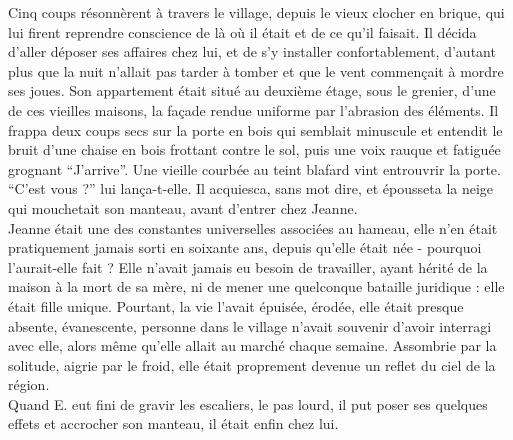 \documentclass[french,amstex,12pt,a5paper]{book}
\begin{document}
Cinq coups résonnèrent à travers le village, depuis le vieux clocher en brique, qui lui firent reprendre conscience de là où il était et de ce qu'il faisait. Il décida d'aller déposer ses affaires chez lui, et de s'y installer confortablement, d'autant plus que la nuit n'allait pas tarder à tomber et que le vent commençait à mordre ses joues. Son appartement était situé au deuxième étage, sous le grenier, d'une de ces vieilles maisons, la façade rendue uniforme par l'abrasion des éléments. Il frappa deux coups secs sur la porte en bois qui semblait minuscule et entendit le bruit d'une chaise en bois frottant contre le sol, puis une voix rauque et fatiguée grognant ``J'arrive''. Une vieille courbée au teint blafard vint entrouvrir la porte. ``C'est vous ?'' lui lança-t-elle. Il acquiesca, sans mot dire, et épousseta la neige qui mouchetait son manteau, avant d'entrer chez Jeanne.\\

Jeanne était une des constantes universelles associées au hameau, elle n'en était pratiquement jamais sorti en soixante ans, depuis qu'elle était née - pourquoi l'aurait-elle fait ? Elle n'avait jamais eu besoin de travailler, ayant hérité de la maison à la mort de sa mère, ni de mener une quelconque bataille juridique : elle était fille unique. Pourtant, la vie l'avait épuisée, érodée, elle était presque absente, évanescente, personne dans le village n'avait souvenir d'avoir interragi avec elle, alors même qu'elle allait au marché chaque semaine. Assombrie par la solitude, aigrie par le froid, elle était proprement devenue un reflet du ciel de la région.\\

Quand E. eut fini de gravir les escaliers, le pas lourd, il put poser ses quelques effets et accrocher son manteau, il était enfin chez lui.
\end{document}
